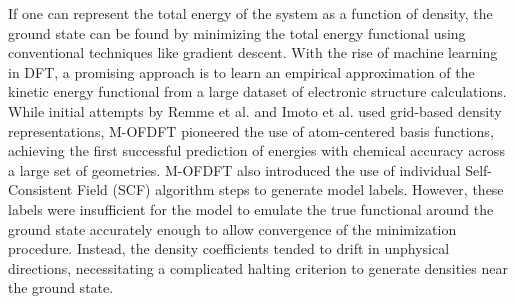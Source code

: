 If one can represent the total energy of the system as a function of density, the ground state can be found by minimizing the total energy functional using conventional techniques like gradient descent. With the rise of machine learning in DFT, a promising approach is to learn an empirical approximation of the kinetic energy functional from a large dataset of electronic structure calculations.
While initial attempts by Remme et al. and Imoto et al. \cite{remme_kineticnet_2023,imoto2021order} used grid-based density representations, \textsc{M-OFDFT} \cite{zhang_m-ofdft_2023} pioneered the use of atom-centered basis functions, achieving the first successful prediction of energies with chemical accuracy across a large set of geometries. \textsc{M-OFDFT} also introduced the use of individual Self-Consistent Field (SCF) algorithm steps to generate model labels.
However, these labels were insufficient for the model to emulate the true functional around the ground state accurately enough to allow convergence of the minimization procedure. Instead, the density coefficients tended to drift in unphysical directions, necessitating a complicated halting criterion to generate densities near the ground state.
